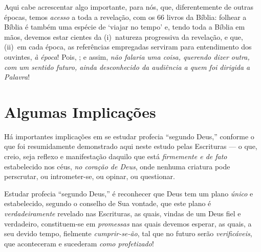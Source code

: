     Aqui cabe acrescentar algo importante, para nós, que,  diferentemente  de  outras  épocas,  temos  \emph{acesso}  a  toda  a
    revelação, com os 66 livros da Bíblia: folhear a Bíblia é também uma espécie de `viajar no tempo' e, tendo toda a Bíblia  em
    mãos, devemos estar cientes da (i)~natureza progressiva da revelação, e que, (ii)~em cada época, as  referências  empregadas
    serviram  para  entendimento  dos  ouvintes,  \emph{à  época}!  Pois,  ; e assim, \emph{não falaria uma coisa, querendo dizer outra, com um  sentido  futuro,  ainda
    desconhecido da audiência a quem foi dirigida a Palavra}!
    


\section{Algumas Implicações}

    Há importantes implicações em se estudar profecia ``segundo Deus,'' conforme o que foi resumidamente demonstrado aqui  neste
    estudo pelas Escrituras --- o que, creio, seja  reflexo  e  manifestação  daquilo  que  está  \emph{firmemente  e  de  fato}
    estabelecido nos céus, \emph{no coração de Deus}, onde nenhuma criatura pode perscrutar, ou  intrometer-se,  ou  opinar,  ou
    questionar.

    Estudar profecia ``segundo Deus,'' é reconhecer que Deus tem um plano \emph{único} e estabelecido, segundo o conselho de Sua
    vontade, que este plano é \emph{verdadeiramente} revelado nas Escrituras, as quais, vindas de um  Deus  fiel  e  verdadeiro,
    constituem-se em \emph{promessas} nas quais devemos esperar, as quais, a seu devido tempo,  fielmente  \emph{cumprir-se-ão},
    tal que no futuro serão \emph{verificáveis}, que aconteceram e sucederam \emph{como profetizado}!

